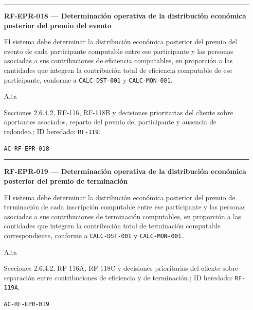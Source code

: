 \documentclass[10pt,letterpaper]{article}
\begin{document}
\vspace{0.25em}\hrule\vspace{0.65em}
\noindent\textbf{RF-EPR-018 --- Determinación operativa de la distribución económica posterior del premio del evento}\par
\begin{description}[style=nextline,leftmargin=3.15cm,labelwidth=2.8cm,font=\normalfont\bfseries]
\item[Obligación] El sistema debe determinar la distribución económica posterior del premio del evento de cada participante computable entre ese participante y las personas asociadas a sus contribuciones de eficiencia computables, en proporción a las cantidades que integren la contribución total de eficiencia computable de ese participante, conforme a \texttt{CALC-DST-001} y \texttt{CALC-MON-001}.
\item[Prioridad] Alta
\item[Procedencia] Secciones 2.6.4.2, RF-116, RF-118B y decisiones prioritarias del cliente sobre aportantes asociados, reparto del premio del participante y ausencia de redondeo.; ID heredado: \texttt{RF-119}.
\item[Verificación] \texttt{AC-RF-EPR-018}
\end{description}
\vspace{0.25em}\hrule\vspace{0.65em}
\noindent\textbf{RF-EPR-019 --- Determinación operativa de la distribución económica posterior del premio de terminación}\par
\begin{description}[style=nextline,leftmargin=3.15cm,labelwidth=2.8cm,font=\normalfont\bfseries]
\item[Obligación] El sistema debe determinar la distribución económica posterior del premio de terminación de cada inscripción computable entre ese participante y las personas asociadas a sus contribuciones de terminación computables, en proporción a las cantidades que integren la contribución total de terminación computable correspondiente, conforme a \texttt{CALC-DST-001} y \texttt{CALC-MON-001}.
\item[Prioridad] Alta
\item[Procedencia] Secciones 2.6.4.2, RF-116A, RF-118C y decisiones prioritarias del cliente sobre separación entre contribuciones de eficiencia y de terminación.; ID heredado: \texttt{RF-119A}.
\item[Verificación] \texttt{AC-RF-EPR-019}
\end{description}
\end{document}
